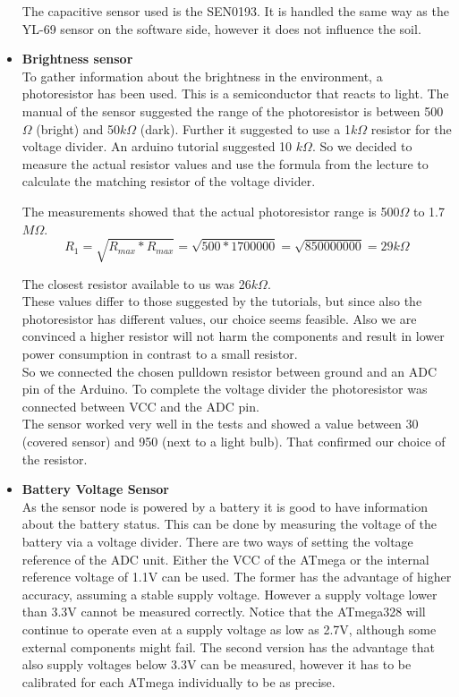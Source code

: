 \begin{itemize}
The capacitive sensor used is the SEN0193. It is handled the same way as the YL-69 sensor on the software side, however it does not influence the soil.




\item \textbf{Brightness sensor}\\
To gather information about the brightness in the environment, a photoresistor has been used. This is a semiconductor that reacts to light. The manual of the sensor suggested the range of the photoresistor is between 500$\Omega$ (bright) and 50$k\Omega$ (dark). 
Further it suggested to use a 1$k\Omega$ resistor for the voltage divider. An arduino tutorial \citep{misc:photoresistor_tutorial} suggested 10 $k\Omega$. So we decided to measure the actual resistor values and use the formula from the lecture to calculate the matching resistor of the voltage divider. %

The measurements showed that the actual photoresistor range is 500$\Omega$ to 1.7$M\Omega$.\\
\begin{equation}
R_1 = \sqrt{R_{max}*R_{max}} = \sqrt{500*1700000} = \sqrt{850000000} = 29k\Omega
\end{equation}


The closest resistor available to us was 26$k\Omega$.\\
These values differ to those suggested by the tutorials, but since also the photoresistor has different values, our choice seems feasible. Also we are convinced a higher resistor will not harm the components and result in lower power consumption in contrast to a small resistor.\\
So we connected the chosen pulldown resistor between ground and an ADC pin of the Arduino. To complete the voltage divider the photoresistor was connected between VCC and the ADC pin.\\

The sensor worked very well in the tests and showed a value between 30 (covered sensor) and 950 (next to a light bulb). That confirmed our choice of the resistor.\\


\item \textbf{Battery Voltage Sensor}\\
As the sensor node is powered by a battery it is good to have information about the battery status.
This can be done by measuring the voltage of the battery via a voltage divider. There are two ways of setting the voltage reference of the ADC unit. Either the VCC of the ATmega or the internal reference voltage of 1.1V can be used.
The former has the advantage of higher accuracy, assuming a stable supply voltage. However a supply voltage lower than 3.3V cannot be measured correctly. Notice that the ATmega328 will continue to operate even at a supply voltage as low as 2.7V, although some external components might fail.
 The second version has the advantage that also supply voltages below 3.3V can be measured, however it has to be calibrated for each ATmega individually to be as precise.


\end{itemize}
